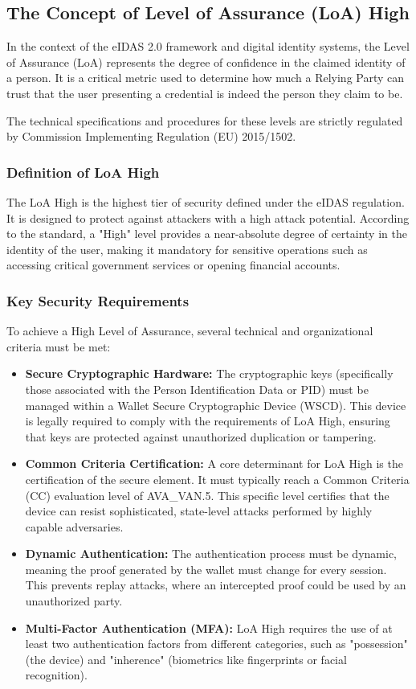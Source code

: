 \documentclass{article}
\begin{document}
\clearpage

\subsection{The Concept of Level of Assurance (LoA) High}
\label{loa}
In the context of the eIDAS 2.0 framework and digital identity systems, the Level of Assurance (LoA) represents the degree 
of confidence in the claimed identity of a person. It is a critical metric used to determine how much a Relying Party can trust
that the user presenting a credential is indeed the person they claim to be.

The technical specifications and procedures for these levels are strictly regulated by Commission Implementing Regulation (EU) 
2015/1502.
\subsubsection{Definition of LoA High}
The LoA High is the highest tier of security defined under the eIDAS regulation. It is designed to protect against attackers
with a high attack potential. According to the standard, a "High" level provides a near-absolute degree of certainty in the 
identity of the user, making it mandatory for sensitive operations such as accessing critical government services or opening 
financial accounts.

\subsubsection{Key Security Requirements}
To achieve a High Level of Assurance, several technical and organizational criteria must be met:
\begin{itemize}
      \item \textbf{Secure Cryptographic Hardware:} The cryptographic keys (specifically those associated with the Person Identification Data or PID) must be managed within a Wallet Secure Cryptographic Device (WSCD). This device is legally required to comply with the requirements of LoA High, ensuring that keys are protected against unauthorized duplication or tampering.
      \item \textbf{Common Criteria Certification:} A core determinant for LoA High is the certification of the secure element. It must typically reach a Common Criteria (CC) evaluation level of AVA\_VAN.5. This specific level certifies that the device can resist sophisticated, state-level attacks performed by highly capable adversaries.
      \item \textbf{Dynamic Authentication:} The authentication process must be dynamic, meaning the proof generated by the wallet must change for every session. This prevents replay attacks, where an intercepted proof could be used by an unauthorized party.
      \item \textbf{Multi-Factor Authentication (MFA):} LoA High requires the use of at least two authentication factors from different categories, such as "possession" (the device) and "inherence" (biometrics like fingerprints or facial recognition).
\end{itemize}
\end{document}
